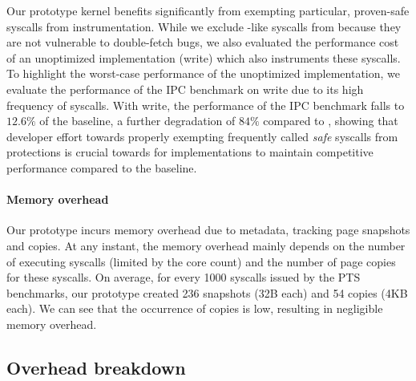 \documentclass[letterpaper,twocolumn,10pt]{article}
\begin{document}
Our prototype \midas kernel benefits significantly from 
exempting particular, proven-safe syscalls from instrumentation.
While we exclude -like syscalls from \midas because they 
are not vulnerable to double-fetch bugs, we also evaluated the
performance cost of an unoptimized implementation (\midas{+}write)
which also instruments these syscalls.
To highlight the worst-case performance of the unoptimized implementation, 
we evaluate the performance of the IPC benchmark on \midas{+}write due 
to its high frequency of  syscalls.
With \midas{+}write, the performance of the IPC benchmark falls to 
$12.6\%$ of the baseline, a further degradation of $84\%$ compared 
to \midas, showing that developer effort towards properly exempting 
frequently called \emph{safe} syscalls from \midas protections is crucial
towards for implementations to maintain competitive performance
compared to the baseline.

\paragraph{Memory overhead}
Our prototype incurs memory overhead due to metadata, tracking page snapshots
and copies. 
At any instant, the memory overhead mainly depends on the number of executing 
syscalls (limited by the core count) and the number of page copies for these 
syscalls.
On average, for every 1000 syscalls issued by the PTS benchmarks, our prototype
created 236 snapshots (32B each) and 54 copies (4KB each).
We can see that the occurrence of copies is low, resulting in negligible 
memory overhead.

\subsection{Overhead breakdown}
\end{document}
